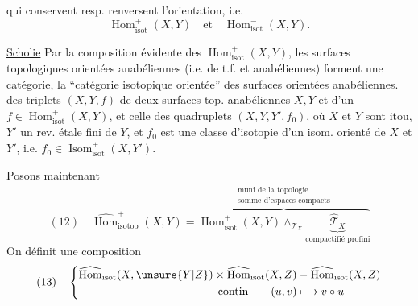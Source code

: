 qui conservent resp. renversent l'orientation, i.e.
\[
\operatorname{Hom}_{\mathrm{isot}}^+(X,Y)\quad\text{et}\quad\operatorname{Hom}_{\mathrm{isot}}^-(X,Y).
\]

\uline{Scholie} Par la composition évidente des $\operatorname{Hom}_{\mathrm{isot}}^+(X,Y)$, les surfaces topologiques orientées anabéliennes (i.e. de t.f. et anabéliennes)  forment une catégorie, la ``catégorie isotopique orientée'' des surfaces orientées anabéliennes.   des triplets $(X,Y,f)$ de deux surfaces top. anabéliennes $X,Y$ et d'un $f\in\operatorname{Hom}_{\mathrm{isot}}^+(X,Y)$, et celle des quadruplets $(X,Y,Y',f_0)$, où $X$ et $Y$ sont itou, $Y'$ un rev. étale fini de $Y$, et $f_0$ est une classe d'isotopie d'un isom. orienté de $X$ et $Y'$, i.e. $f_0\in\operatorname{Isom}_{\mathrm{isot}}^+(X,Y')$.

Posons maintenant
\[
(12)\quad
\widehat{\operatorname{Hom}}^{+}_{\mathrm{isotop}}(X,Y)
=\overbrace{\operatorname{Hom}^{+}_{\mathrm{isot}}(X,Y)\mathop{\wedge}_{\mathcal{T}_X}
\underbrace{\widehat{\mathcal{T}}_X}_{\text{compactifié profini}}}^{\substack{\text{muni de la topologie}\\\text{somme d'espaces compacts}}}
\]
On définit une composition
\[
(13)\quad\left\{
\begin{aligned}
\widehat{\operatorname{Hom}}_{\mathrm{isot}}(X,\unsure{Y|Z})\times
\widehat{\operatorname{Hom}}_{\mathrm{isot}}(X,Z)
&\mathbin{-}\widehat{\operatorname{Hom}}_{\mathrm{isot}}(X,Z)\\
\text{contin}\qquad (u,v)&\longmapsto v\circ u
\end{aligned}\right.
\]
